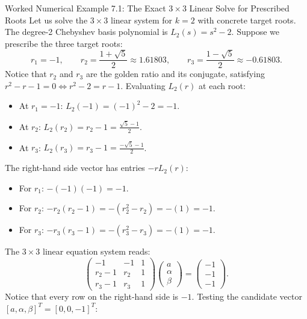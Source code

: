 \documentclass[11pt]{article}
\begin{document}
\begin{callbox}{Worked Numerical Example 7.1: The Exact $3 \times 3$ Linear Solve for Prescribed Roots}
Let us solve the $3 \times 3$ linear system for $k=2$ with concrete target roots.
The degree-2 Chebyshev basis polynomial is $L_2(s) = s^2 - 2$.
Suppose we prescribe the three target roots:
\begin{equation}
  r_1 = -1, \qquad r_2 = \frac{1+\sqrt{5}}{2} \approx 1.61803, \qquad r_3 = \frac{1-\sqrt{5}}{2} \approx -0.61803.
\end{equation}
Notice that $r_2$ and $r_3$ are the golden ratio and its conjugate, satisfying $r^2 - r - 1 = 0 \iff r^2 - 2 = r - 1$.
Evaluating $L_2(r)$ at each root:
\begin{itemize}[leftmargin=*,nosep]
  \item At $r_1 = -1$: $L_2(-1) = (-1)^2 - 2 = -1$.
  \item At $r_2$: $L_2(r_2) = r_2 - 1 = \frac{\sqrt{5}-1}{2}$.
  \item At $r_3$: $L_2(r_3) = r_3 - 1 = \frac{-\sqrt{5}-1}{2}$.
\end{itemize}
The right-hand side vector has entries $-r L_2(r)$:
\begin{itemize}[leftmargin=*,nosep]
  \item For $r_1$: $-(-1)(-1) = -1$.
  \item For $r_2$: $-r_2(r_2 - 1) = -(r_2^2 - r_2) = -(1) = -1$.
  \item For $r_3$: $-r_3(r_3 - 1) = -(r_3^2 - r_3) = -(1) = -1$.
\end{itemize}
The $3 \times 3$ linear equation system reads:
\begin{equation}
  \begin{pmatrix}
    -1 & -1 & 1 \\
    r_2 - 1 & r_2 & 1 \\
    r_3 - 1 & r_3 & 1
  \end{pmatrix}
  \begin{pmatrix} a \\ \alpha \\ \beta \end{pmatrix} =
  \begin{pmatrix} -1 \\ -1 \\ -1 \end{pmatrix}.
\end{equation}
Notice that every row on the right-hand side is $-1$.
Testing the candidate vector $[a, \alpha, \beta]^T = [0, 0, -1]^T$:
\begin{align}

\end{align}
\end{callbox}
\end{document}
